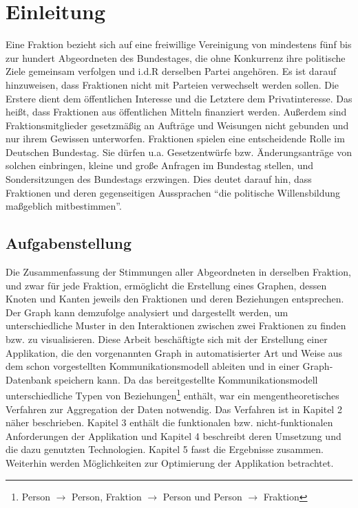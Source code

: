\section{Einleitung}\label{sec:06_01_einleitung}
Eine Fraktion bezieht sich auf eine freiwillige Vereinigung von mindestens fünf bis zur hundert Abgeordneten des Bundestages, die ohne Konkurrenz
ihre politische Ziele gemeinsam verfolgen und i.d.R derselben Partei angehören.
Es ist darauf hinzuweisen, dass Fraktionen nicht mit Parteien verwechselt werden sollen. Die Erstere dient dem öffentlichen Interesse und die Letztere dem Privatinteresse.
Das heißt, dass Fraktionen aus öffentlichen Mitteln finanziert werden.
Außerdem sind Fraktionsmitglieder gesetzmäßig an Aufträge und Weisungen nicht gebunden und nur ihrem Gewissen unterworfen.\newline 
Fraktionen spielen eine entscheidende Rolle im Deutschen Bundestag. 
Sie dürfen u.a. Gesetzentwürfe bzw. Änderungsanträge von solchen einbringen, kleine und große Anfragen im Bundestag stellen, und Sondersitzungen des Bundestags erzwingen. 
Dies deutet darauf hin, dass Fraktionen und deren gegenseitigen Aussprachen ``die politische Willensbildung maßgeblich mitbestimmen''. 
\subsection{Aufgabenstellung}
Die Zusammenfassung der Stimmungen aller Abgeordneten in derselben Fraktion, und zwar für jede Fraktion, ermöglicht
die Erstellung eines Graphen, dessen Knoten und Kanten jeweils den Fraktionen und deren Beziehungen entsprechen. 
Der Graph kann demzufolge analysiert und dargestellt werden, um unterschiedliche Muster in den Interaktionen zwischen zwei Fraktionen zu finden bzw. zu visualisieren.
Diese Arbeit beschäftigte sich mit der Erstellung einer Applikation, die den vorgenannten Graph in automatisierter Art und Weise aus dem schon vorgestellten Kommunikationsmodell ableiten und in einer Graph-Datenbank speichern kann.\newline 
Da das bereitgestellte Kommunikationsmodell unterschiedliche Typen von Beziehungen\footnote{Person $\rightarrow$ Person, Fraktion $\rightarrow$ Person und Person $\rightarrow$ Fraktion} enthält, war ein mengentheoretisches Verfahren zur Aggregation der Daten notwendig. Das Verfahren ist in Kapitel 2 näher beschrieben. 
Kapitel 3 enthält die funktionalen bzw. nicht-funktionalen Anforderungen der Applikation und Kapitel 4 beschreibt deren Umsetzung und die dazu genutzten Technologien. 
Kapitel 5 fasst die Ergebnisse zusammen. Weiterhin werden Möglichkeiten zur Optimierung der Applikation betrachtet. 
